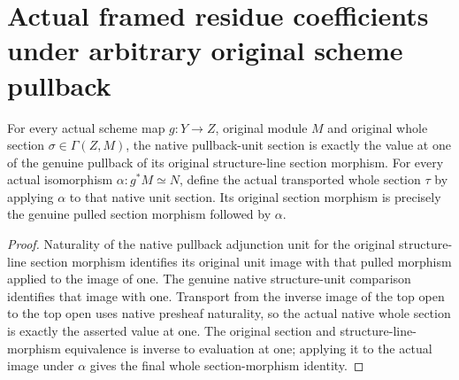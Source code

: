 \section{Actual framed residue coefficients under arbitrary original scheme pullback}

\begin{lemma}\label{lem:fc-native-unit-section-morphism}
\leanok
{}
For every actual scheme map $g:Y\to Z$, original module $M$ and
original whole section $\sigma\in\Gamma(Z,M)$, the native pullback-unit
section is exactly the value at one of the genuine pullback of its
original structure-line section morphism. For every actual
isomorphism $\alpha:g^*M\simeq N$, define the actual transported
whole section $\tau$ by applying $\alpha$ to that native unit section.
Its original section morphism is precisely the genuine pulled section
morphism followed by $\alpha$.
\end{lemma}
\begin{proof}
Naturality of the native pullback adjunction unit for the original
structure-line section morphism identifies its original unit image
with that pulled morphism applied to the image of one. The genuine
native structure-unit comparison identifies that image with one.
Transport from the inverse image of the top open to the top open
uses native presheaf naturality, so the actual native whole section
is exactly the asserted value at one. The original section and
structure-line-morphism equivalence is inverse to evaluation at one;
applying it to the actual image under $\alpha$ gives the final whole
section-morphism identity.
\end{proof}


